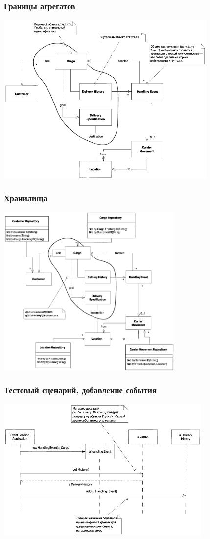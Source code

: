\documentclass[xetex,mathserif,serif]{beamer}
\begin{document}
	\begin{frame}
		\frametitle{Границы агрегатов}
		\begin{center}
			\includegraphics[width=0.82\textwidth]{cargoAggregates.png}
		\end{center}
	\end{frame}

	\begin{frame}
		\frametitle{Хранилища}
		\begin{center}
			\includegraphics[width=0.69\textwidth]{cargoRepositories.png}
		\end{center}
	\end{frame}

	\begin{frame}
		\frametitle{Тестовый сценарий, добавление события}
		\begin{center}
			\includegraphics[width=0.8\textwidth]{cargoAddEvent.png}
		\end{center}
	\end{frame}
\end{document}
